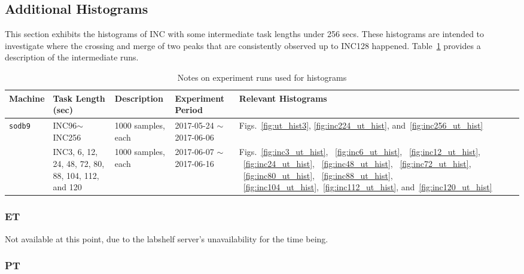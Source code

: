 \clearpage

\pagebreak
\newpage

\subsection{Additional Histograms}
This section exhibits the histograms of INC with some intermediate task lengths under 256 secs. 
These histograms are intended to investigate where the crossing and merge of two peaks that are consistently observed up to INC128 
happened. Table~\ref{tab:exp_notes4} provides a description of the intermediate runs. 
\begin{table}[h]
\begin{center}
\begin{tabular}{|p{2cm}|p{3cm}|p{3cm}|p{4cm}|p{3.5cm}|} \hline
Machine & Task Length (sec) & Description & Experiment Period & Relevant \linebreak Histograms\\ \hline
{\tt sodb9} &  INC96$\sim$INC256 & 1000 samples, each & 2017-05-24 $\sim$ 2017-06-06 & 
Figs.~\ref{fig:ut_hist3}, \ref{fig:inc224_ut_hist}, and~\ref{fig:inc256_ut_hist}\\ \hline
					&  INC3, 6, 12, 24, 48, 72, 80, 88, 104, 112, and 120 & 1000 samples, each & 2017-06-07 $\sim$ 2017-06-16 & Figs.~\ref{fig:inc3_ut_hist}, ~\ref{fig:inc6_ut_hist}, ~\ref{fig:inc12_ut_hist}, ~\ref{fig:inc24_ut_hist},
~\ref{fig:inc48_ut_hist}, ~\ref{fig:inc72_ut_hist}, ~\ref{fig:inc80_ut_hist}, ~\ref{fig:inc88_ut_hist}, ~\ref{fig:inc104_ut_hist},~\ref{fig:inc112_ut_hist}, and~\ref{fig:inc120_ut_hist}\\ \hline
\end{tabular}
\end{center}
\vspace{-.2in}
\caption{Notes on experiment runs used for histograms\label{tab:exp_notes4}}
\end{table}

\subsubsection{ET}
Not available at this point, due to the labshelf server's unavailability for the time being.

\pagebreak

\subsubsection{PT}

